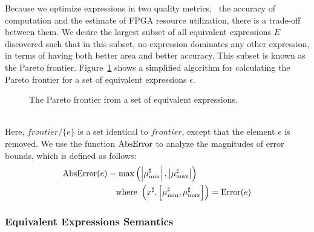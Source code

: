 Because we optimize expressions in two quality metrics, \ie~the accuracy of
computation and the estimate of FPGA resource utilization, there is a trade-off
between them. We desire the largest subset of all equivalent expressions
$E$ discovered such that in this subset, no expression dominates any other
expression, in terms of having both better area and better accuracy. This
subset is known as the Pareto frontier.  Figure~\ref{so:alg:pareto} shows
a simplified algorithm for calculating the Pareto frontier for a set of
equivalent expressions $\epsilon$.
\begin{figure}[ht]
    \centering
    \begin{algorithmic}
                    \EndIf{}
                \EndFor{}
            \EndFor{}
        \EndFunction%
    \end{algorithmic}
    \caption{The Pareto frontier from a set of equivalent expressions.
    }\label{so:alg:pareto}
\end{figure} \\
Here, $\mathit{frontier} / \{ e \}$ is a set identical to $\mathit{frontier}$,
except that the element $e$ is removed.  We use the function $\operatorname{\mathrm{AbsError}}$ to
analyze the magnitudes of error bounds, which is defined as follows:
\begin{equation}
    \begin{aligned}
        \operatorname{\mathrm{AbsError}}(e) &= \max\left(
            \left| \mu^\sharp_{\min} \right|,
            \left| \mu^\sharp_{\max} \right|
        \right) \\
        & \quad \text{where~}
        \left(
            x^\sharp, \left[ \mu^\sharp_{\min}, \mu^\sharp_{\max} \right]
        \right) = \operatorname{\mathrm{Error}}(e)
    \end{aligned}
\end{equation}

\subsubsection{Equivalent Expressions Semantics}

